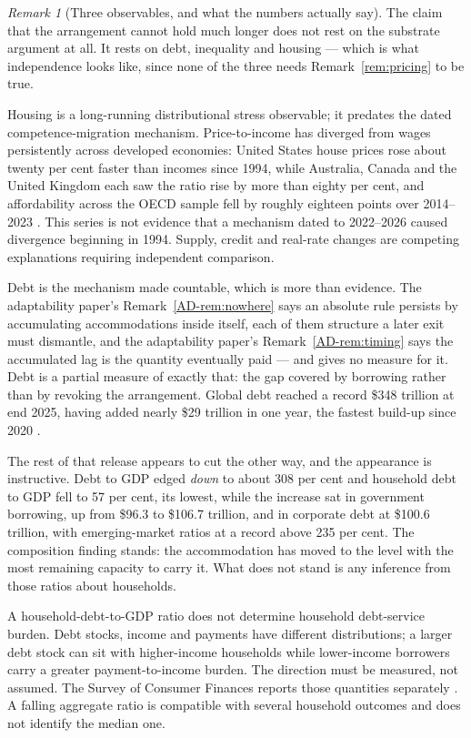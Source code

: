\documentclass[11pt,a4paper]{article}
\theoremstyle{remark}
\newtheorem{remark}[definition]{Remark}
\begin{document}
\begin{remark}[Three observables, and what the numbers actually say]\label{rem:observables}
The claim that the arrangement cannot hold much longer does not rest on the substrate argument at all.
It rests on debt, inequality and housing --- which is what independence looks like, since none of
the three needs Remark~\ref{rem:pricing} to be true.

Housing is a long-running distributional stress observable; it predates the dated competence-migration mechanism. Price-to-income has diverged from
wages persistently across developed economies: United States house prices rose about twenty per cent
faster than incomes since 1994, while Australia, Canada and the United Kingdom each saw the ratio rise by
more than eighty per cent, and affordability across the OECD sample fell by roughly eighteen points over
2014--2023 \citep{oecdhousing}. This series is not evidence that a mechanism dated to 2022--2026 caused divergence beginning in 1994. Supply, credit and real-rate changes are competing explanations requiring independent comparison.

Debt is the mechanism made countable, which is more than evidence. The adaptability paper's Remark~\ref{AD-rem:nowhere} says
an absolute rule persists by accumulating accommodations inside itself, each of them structure a later
exit must dismantle, and the adaptability paper's Remark~\ref{AD-rem:timing} says the accumulated lag is the quantity eventually
paid --- and gives no measure for it. Debt is a partial measure of exactly that: the gap covered
by borrowing rather than by revoking the arrangement. Global debt reached a record \$348 trillion at end
2025, having added nearly \$29 trillion in one year, the fastest build-up since 2020 \citep{iif2026}.

The rest of that release appears to cut the other way, and the appearance is instructive. Debt to
GDP edged \emph{down} to about 308 per cent and household debt to GDP fell to 57 per cent, its lowest,
while the increase sat in government borrowing, up from \$96.3 to \$106.7 trillion, and in corporate debt
at \$100.6 trillion, with emerging-market ratios at a record above 235 per cent. The composition
finding stands: the accommodation has moved to the level with the most remaining capacity to carry it.
What does not stand is any inference from those ratios about households.

A household-debt-to-GDP ratio does not determine household debt-service
burden. Debt stocks, income and payments have different distributions; a
larger debt stock can sit with higher-income households while lower-income
borrowers carry a greater payment-to-income burden. The direction must be
measured, not assumed. The Survey of Consumer Finances reports those
quantities separately \citep{scf2023}. A falling aggregate ratio is compatible
with several household outcomes and does not identify the median one.


\end{remark}
\end{document}
